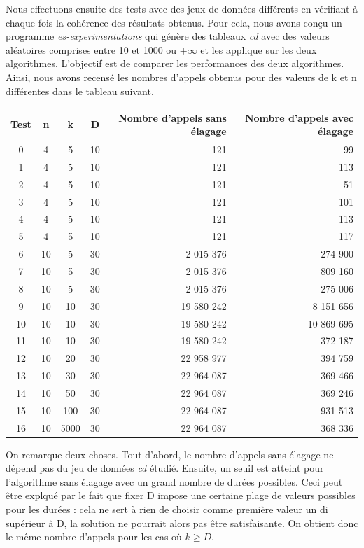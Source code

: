 \documentclass[a4paper, titlepage]{article}
\begin{document}
	Nous effectuons ensuite des tests avec des jeux de données différents en vérifiant à chaque fois la cohérence des résultats obtenus.
	Pour cela, nous avons conçu un programme \emph{es-experimentations} qui génère des tableaux \emph{cd} avec des valeurs aléatoires comprises entre 10 et 1000 ou $+\infty$ et les applique sur les deux algorithmes.
	L'objectif est de comparer les performances des deux algorithmes.
	Ainsi, nous avons recensé les nombres d'appels obtenus pour des valeurs de k et n différentes dans le tableau suivant.

	\begin{center}
		\begin{tabular}{|c|c|c|c|r|r|}
			\hline
			Test	& n	& k	& D	& Nombre d'appels sans élagage & Nombre d'appels avec élagage \\
			\hline
			0 	& 4	& 5	& 10	& 121 	& 99 \\
			\hline
			1 	& 4	& 5	& 10 	& 121	& 113 \\
			2 	& 4	& 5	& 10 	& 121	& 51 \\
			3 	& 4	& 5	& 10 	& 121	& 101 \\
			4 	& 4	& 5	& 10 	& 121	& 113 \\
			5 	& 4	& 5	& 10 	& 121	& 117 \\
			\hline
			6 	& 10	& 5	& 30 	& 2 015 376 	& 274 900 \\
			7 	& 10	& 5	& 30 	& 2 015 376 	& 809 160 \\
			8 	& 10	& 5	& 30 	& 2 015 376 	& 275 006 \\
			\hline
			9 	& 10	& 10	& 30 	& 19 580 242 	& 8 151 656 \\
			10 	& 10	& 10	& 30 	& 19 580 242 	& 10 869 695 \\
			11 	& 10	& 10	& 30 	& 19 580 242 	& 372 187 \\
			\hline
			12 	& 10	& 20	& 30 	& 22 958 977 	& 394 759 \\
			13 	& 10	& 30	& 30 	& 22 964 087 	& 369 466 \\
			14 	& 10	& 50	& 30 	& 22 964 087 	& 369 246 \\
			\hline
			15 	& 10	& 100	& 30 	& 22 964 087 	& 931 513 \\
			16 	& 10	& 5000 	& 30 	& 22 964 087 	& 368 336 \\

			\hline
		\end{tabular}
	\end{center}
	
	On remarque deux choses.
	Tout d'abord, le nombre d'appels sans élagage ne dépend pas du jeu de données \emph{cd} étudié.
	Ensuite, un seuil est atteint pour l'algorithme sans élagage avec un grand nombre de durées possibles.
	Ceci peut être explqué par le fait que fixer D impose une certaine plage de valeurs possibles pour les durées : cela ne sert à rien de choisir comme première valeur un di supérieur à D, la solution ne pourrait alors pas être satisfaisante.
	On obtient donc le même nombre d'appels pour les cas où $k \ge D$.
	
\end{document}
